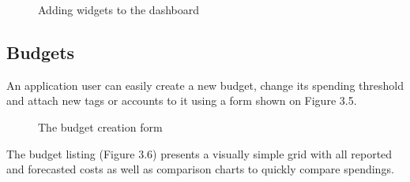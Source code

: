 \documentclass[licencjacka,en]{thesisclass}
\begin{document}
    \begin{figure}[H]
      \caption{Adding widgets to the dashboard\label{fig:scr-dashboard-add}}
    \end{figure}


    \subsection{Budgets}

    An application user can easily create a new budget,
    change its spending threshold and attach new tags or accounts to it
    using a form shown on Figure 3.5.

    \begin{figure}[H]
      \caption{The budget creation form\label{fig:scr-budget-create}}
    \end{figure}

    The budget listing (Figure 3.6) presents a visually simple grid with all reported and forecasted
    costs as well as comparison charts to quickly compare spendings.
\end{document}
